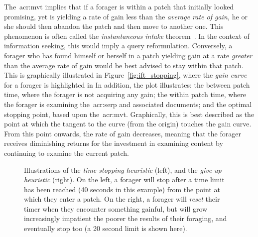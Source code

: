 The~\gls{acr:mvt} implies that if a forager is within a patch that initially looked promising, yet is yielding a rate of gain less than the \emph{average rate of gain,} he or she should then abandon the patch and then move to another one. This phenomenon is often called the \emph{instantaneous intake} theorem~\citep{stephens1986foraging_theory}. In the context of information seeking, this would imply a query reformulation. Conversely, a forager who has found himself or herself in a patch yielding gain at a rate \emph{greater} than the average rate of gain would be best advised to stay within that patch. This is graphically illustrated in Figure~\ref{fig:ift_stopping}, where the \emph{gain curve} for a forager is highlighted in  In addition, the plot illustrates:  the between patch time, where the forager is not acquiring any gain;  the within patch time, where the forager is examining the~\gls{acr:serp} and associated documents; and  the optimal stopping point, based upon the~\gls{acr:mvt}. Graphically, this is best described as the point at which the tangent to the curve (from the origin) touches the gain curve. From this point onwards, the rate of gain decreases, meaning that the forager receives diminishing returns for the investment in examining content by continuing to examine the current patch.

\begin{figure}[t!]
    \centering
    \caption[Time-based stopping heuristics]{Illustrations of the \emph{time stopping heuristic} (left), and the \emph{give up heuristic} (right). On the left, a forager will stop after a time limit has been reached (40 seconds in this example) from the point at which they enter a patch. On the right, a forager will \emph{reset} their timer when they encounter something gainful, but will grow increasingly impatient the poorer the results of their foraging, and eventually stop too (a 20 second limit is shown here).}
    \label{fig:gut}
\end{figure}

